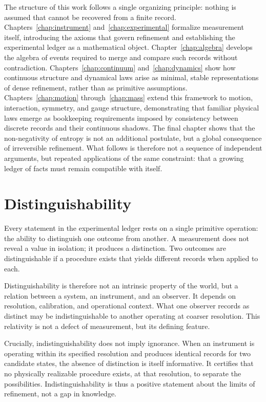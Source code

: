 The structure of this work follows a single organizing principle: nothing is
assumed that cannot be recovered from a finite record. Chapters~\ref{chap:instrument}
and~\ref{chap:experimental} formalize
measurement itself, introducing the axioms that govern refinement
and establishing the experimental ledger as a mathematical object. Chapter~\ref{chap:algebra}
develops the algebra of events required to merge and compare such records
without contradiction. Chapters~\ref{chap:continuum} and~\ref{chap:dynamics} show how 
continuous structure and
dynamical laws arise as minimal, stable representations of dense refinement,
rather than as primitive assumptions. Chapters~\ref{chap:motion} through~\ref{chap:mass} 
extend this
framework to motion, interaction, symmetry, and gauge structure, demonstrating
that familiar physical laws emerge as bookkeeping requirements imposed by
consistency between discrete records and their continuous shadows. The final
chapter shows that the non-negativity of entropy is not an additional postulate,
but a global consequence of irreversible refinement. What follows is therefore
not a sequence of independent arguments, but repeated applications of the same
constraint: that a growing ledger of facts must remain compatible with itself.

\section{Distinguishability}

Every statement in the experimental ledger rests on a single primitive
operation: the ability to distinguish one outcome from another. A measurement
does not reveal a value in isolation; it produces a distinction. Two outcomes
are distinguishable if a procedure exists that yields
different records when applied to each.

Distinguishability is therefore not an intrinsic property of the world, but a
relation between a system, an instrument, and an observer. It depends on
resolution, calibration, and operational context. What one observer records as
distinct may be indistinguishable to another operating at coarser resolution.
This relativity is not a defect of measurement, but its defining feature.

Crucially, indistinguishability does not imply ignorance. When an instrument is
operating within its specified resolution and produces identical records for
two candidate states, the absence of distinction is itself informative. It
certifies that no physically realizable procedure exists, at that resolution,
to separate the possibilities. Indistinguishability is thus a positive statement
about the limits of refinement, not a gap in knowledge.

